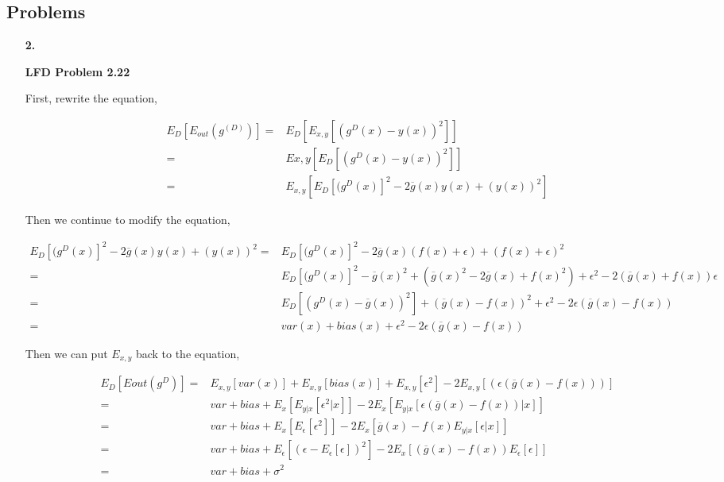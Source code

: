 \documentclass[11pt]{article}
\begin{document}
\pagebreak

\subsection*{Problems}
\begin{enumerate}

\item[\textbf{2.}]

\textbf{LFD Problem 2.22}

First, rewrite the equation, 

\begin{equation}
\begin{aligned}
E_D[E_{out}(g^{(D)})] =& E_D[E_{x,y}[(g^{D}(x) - y(x))^2]]\\
=& E{x,y}[E_{D}[(g^{D}(x) - y(x))^2]]\\
=& E_{x,y}[E_{D}[(g^{D}(x)]^2 - 2 \overline{g}(x)y(x) + (y(x))^2]
\end{aligned}
\end{equation}

Then we continue to modify the equation, 

\begin{equation}
\begin{aligned}
E_{D}[(g^{D}(x)]^2 - 2 \overline{g}(x)y(x) + (y(x))^2
=& E_{D}[(g^{D}(x)]^2 - 2 \overline{g}(x)(f(x) + \epsilon) + (f(x) + \epsilon)^2\\
=& E_{D}[(g^{D}(x)]^2 - \overline{g}(x)^2 + (\overline{g}(x)^2 - 2\overline{g}(x) + f(x)^2) + \epsilon^2 - 2 (\overline{g}(x) + f(x))\epsilon\\
=& E_{D}[(g^{D}(x) - \overline{g}(x))^2] + (\overline{g}(x) - f(x))^2 + \epsilon^2 -2\epsilon(\overline{g}(x)-f(x))\\
=& var(x) + bias(x) + \epsilon^2 - 2\epsilon(\overline{g}(x)-f(x))
\end{aligned}
\end{equation}

Then we can put $E_{x,y}$ back to the equation,

\begin{equation}
\begin{aligned}
E_{D}[E{out}(g^{D})] =& E_{x,y}[var(x)] + E_{x,y}[bias(x)] + E_{x,y}[\epsilon^2] - 2E_{x,y}[(\epsilon(\overline{g}(x) - f(x)))]\\
=& var + bias + E_{x}[E_{y|x}[\epsilon^2|x]] - 2E_{x}[E_{y|x}[\epsilon(\overline{g}(x) - f(x)) | x]]\\
=& var + bias + E_{x}[E_{\epsilon}[\epsilon^2]] - 2E_{x}[\overline{g}(x) - f(x)E_{y|x}[\epsilon|x]]\\
=& var + bias + E_{\epsilon}[(\epsilon - E_{\epsilon}[\epsilon])^2] - 2E_{x}[(\overline{g}(x)-f(x))E_{\epsilon}[\epsilon]]\\
=& var + bias + \sigma^2
\end{aligned}
\end{equation}
 
\end{enumerate}
\end{document}
